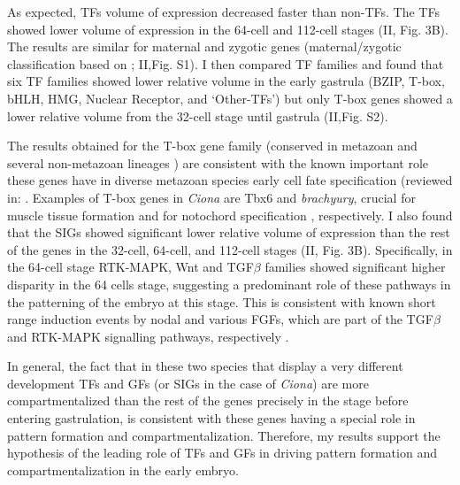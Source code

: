 
As expected, TFs volume of expression decreased faster than non-TFs. The TFs showed lower volume of expression in the 64-cell and 112-cell stages (II, Fig. 3B). 
The results are similar for maternal and zygotic genes (maternal/zygotic classification based on \citealp{Matsuoka2013}; II,Fig. S1). I then compared TF families and found that six TF families showed lower relative volume in the early gastrula (BZIP, T-box, bHLH, HMG, Nuclear Receptor, and `Other-TFs') but only T-box genes showed a lower relative volume from the 32-cell stage until gastrula (II,Fig. S2). 

The results obtained for the T-box gene family (conserved in metazoan and several non-metazoan lineages \citep{Sebe-Pedros2013}) are consistent with the known important role these genes have in diverse metazoan species early cell fate specification (reviewed in: \citealp{Papaioannou2014,Showell2004}.
Examples of T-box genes in \textit{Ciona} are Tbx6 and \textit{brachyury}, crucial for muscle tissue formation \citep{Mitani1999,Nishida2005} and for notochord specification \citep{Yasuo1998}, respectively.
I also found that the SIGs showed significant lower relative volume of expression than the rest of the genes in the 32-cell, 64-cell, and 112-cell stages (II, Fig. 3B).
Specifically, in the 64-cell stage RTK-MAPK, Wnt and TGF$\beta$ families showed significant higher disparity in the 64 cells stage, suggesting a predominant role of these pathways in the patterning of the embryo at this stage. 
This is consistent with known short range induction events by nodal and various FGFs, which are part of the TGF$\beta$ and RTK-MAPK signalling pathways, respectively \citep{Lemaire2008}.


In general, the fact that in these two species that display a very different development TFs and GFs (or SIGs in the case of \textit{Ciona}) are more compartmentalized than the rest of the genes precisely in the stage before entering gastrulation, is consistent with these genes having a special role in pattern formation and compartmentalization.
Therefore, my results support the hypothesis of the leading role of TFs and GFs in driving pattern formation and compartmentalization in the early embryo.

